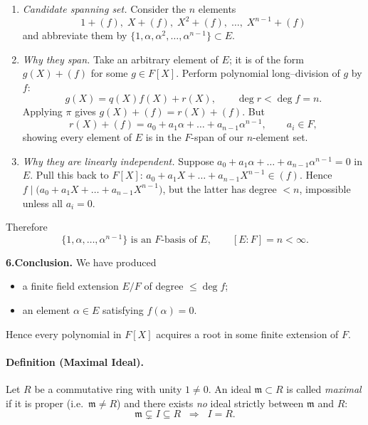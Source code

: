 \documentclass[12pt]{article}
\theoremstyle{definition} %
\theoremstyle{plain} %
\begin{document}
\begin{enumerate}[label=\alph*)]
\item \emph{Candidate spanning set.}  
      Consider the \(n\) elements
      \[
           1+(f),\;X+(f),\;X^{2}+(f),\;\dots,\;X^{n-1}+(f)
      \]
      and abbreviate them by
      \(\{1,\alpha,\alpha^{2},\dots,\alpha^{n-1}\}\subset E\).
\item \emph{Why they span.}  
      Take an arbitrary element of \(E\); it is of the form
      \(g(X)+(f)\) for some \(g\in F[X]\).
      Perform polynomial long–division of \(g\) by \(f\):
      \[
           g(X)=q(X)f(X)+r(X),\qquad \deg r<\deg f=n.
      \]
      Applying \(\pi\) gives
      \(
         g(X)+(f)=r(X)+(f).
      \)
      But
      \[
           r(X)+(f)=a_{0}+a_{1}\alpha+\dots+a_{n-1}\alpha^{n-1},
           \qquad a_{i}\in F,
      \]
      showing every element of \(E\) is in the \(F\)-span of our
      \(n\)-element set.
\item \emph{Why they are linearly independent.}  
      Suppose
      \(
           a_{0}+a_{1}\alpha+\dots+a_{n-1}\alpha^{n-1}=0
      \)
      in \(E\).
      Pull this back to \(F[X]\):
      \(
           a_{0}+a_{1}X+\dots+a_{n-1}X^{n-1}\in(f).
      \)
      Hence \(f\mid\bigl(a_{0}+a_{1}X+\dots+a_{n-1}X^{n-1}\bigr)\),
      but the latter has degree \(<n\), impossible unless all
      \(a_{i}=0\).
\end{enumerate}
Therefore
\[
     \bigl\{1,\alpha,\dots,\alpha^{n-1}\bigr\}
     \text{ is an }F\text{-basis of }E,
     \qquad
     [E:F]=n<\infty.
\]

\medskip
\textbf{6.\;Conclusion.}
We have produced
\begin{itemize}
\item a finite field extension \(E/F\)
      of degree \(\le\deg f\);
\item an element \(\alpha\in E\) satisfying \(f(\alpha)=0\).
\end{itemize}
Hence every polynomial in \(F[X]\) acquires a root in some
finite extension of \(F\).\qedhere

\paragraph{Definition (Maximal Ideal).}
Let \(R\) be a commutative ring with unity \(1\neq 0\).
An ideal \( \mathfrak{m}\subset R \) is called \emph{maximal} if it is
proper (i.e.\ \( \mathfrak{m}\neq R \)) and there exists
\emph{no} ideal strictly between \( \mathfrak{m} \) and \( R \):
\[
   \mathfrak{m}\subsetneq I\subseteq R
   \;\;\Longrightarrow\;\;
   I = R .
\]
\end{document}
